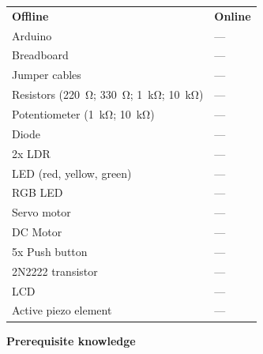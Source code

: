 \documentclass{arduino}
\begin{document}
\begin{tabular}{
    @{}>{\raggedright\arraybackslash}p{}
    >{\raggedright\arraybackslash}p{}@{}
}
\textbf{Offline}                                                                  & \textbf{Online} \\
Arduino                                                                           & ---             \\
Breadboard                                                                        & ---             \\
Jumper cables                                                                     & ---             \\
Resistors (\SI{220}{\ohm}; \SI{330}{\ohm}; \SI{1}{\kilo\ohm}; \SI{10}{\kilo\ohm}) & ---             \\
Potentiometer (\SI{1}{\kilo\ohm}; \SI{10}{\kilo\ohm})                             & ---             \\
Diode                                                                             & ---             \\
2x LDR                                                                            & ---             \\
LED (red, yellow, green)                                                          & ---             \\
RGB LED                                                                           & ---             \\
Servo motor                                                                       & ---             \\
DC Motor                                                                          & ---             \\
5x Push button                                                                    & ---             \\
2N2222 transistor                                                                 & ---             \\
LCD                                                                               & ---             \\
Active piezo element                                                              & ---             \\
\end{tabular}

\textbf{Prerequisite knowledge}
\end{document}
